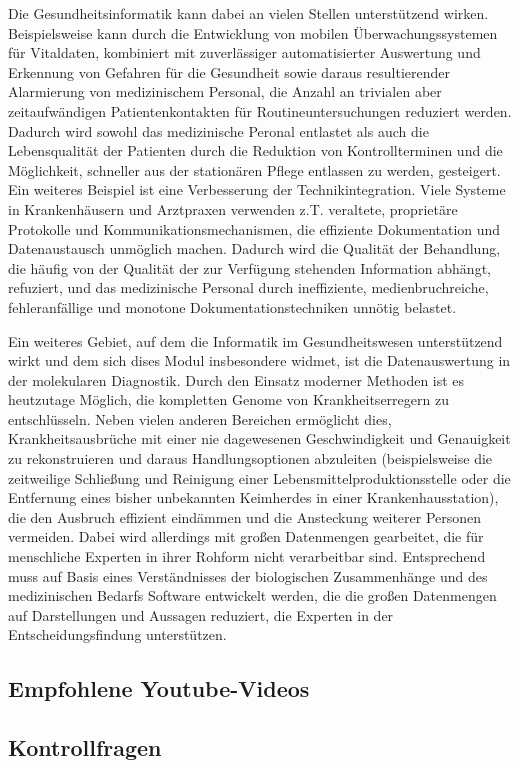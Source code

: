 Die Gesundheitsinformatik kann dabei an vielen Stellen unterstützend wirken. Beispielsweise kann durch die Entwicklung von mobilen Überwachungssystemen für Vitaldaten, kombiniert mit zuverlässiger automatisierter Auswertung und Erkennung von Gefahren für die Gesundheit sowie daraus resultierender Alarmierung von medizinischem Personal, die Anzahl an trivialen aber zeitaufwändigen Patientenkontakten für Routineuntersuchungen reduziert werden. Dadurch wird sowohl das medizinische Peronal entlastet als auch die Lebensqualität der Patienten durch die Reduktion von Kontrollterminen und die Möglichkeit, schneller aus der stationären Pflege entlassen zu werden, gesteigert. Ein weiteres Beispiel ist eine Verbesserung der Technikintegration. Viele Systeme in Krankenhäusern und Arztpraxen verwenden z.T. veraltete, proprietäre Protokolle und Kommunikationsmechanismen, die effiziente Dokumentation und Datenaustausch unmöglich machen. Dadurch wird die Qualität der Behandlung, die häufig von der Qualität der zur Verfügung stehenden Information abhängt, refuziert, und das medizinische Personal durch ineffiziente, medienbruchreiche, fehleranfällige und monotone Dokumentationstechniken unnötig belastet.

Ein weiteres Gebiet, auf dem die Informatik im Gesundheitswesen unterstützend wirkt und dem sich dises Modul insbesondere widmet, ist die Datenauswertung in der molekularen Diagnostik. Durch den Einsatz moderner Methoden ist es heutzutage Möglich, die kompletten Genome von Krankheitserregern zu entschlüsseln. Neben vielen anderen Bereichen ermöglicht dies, Krankheitsausbrüche mit einer nie dagewesenen Geschwindigkeit und Genauigkeit zu rekonstruieren und daraus Handlungsoptionen abzuleiten (beispielsweise die zeitweilige Schließung und Reinigung einer Lebensmittelproduktionsstelle oder die Entfernung eines bisher unbekannten Keimherdes in einer Krankenhausstation), die den Ausbruch effizient eindämmen und die Ansteckung weiterer Personen vermeiden. Dabei wird allerdings mit großen Datenmengen gearbeitet, die für menschliche Experten in ihrer Rohform nicht verarbeitbar sind. Entsprechend muss auf Basis eines Verständnisses der biologischen Zusammenhänge und des medizinischen Bedarfs Software entwickelt werden, die die großen Datenmengen auf Darstellungen und Aussagen reduziert, die Experten in der Entscheidungsfindung unterstützen. 


\subsection{Empfohlene Youtube-Videos}

\subsection{Kontrollfragen}
